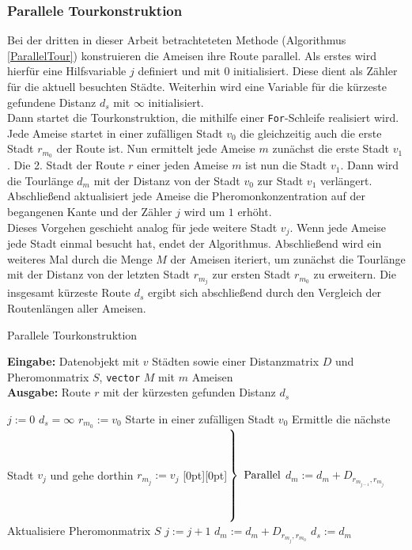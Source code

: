 \documentclass[doktyp=barbeit, sprache=german]{TUBAFarbeiten}
\begin{document}
\subsubsection{Parallele Tourkonstruktion}
Bei der dritten in dieser Arbeit betrachteteten Methode (Algorithmus \ref{ParallelTour}) konstruieren die Ameisen ihre Route parallel.
Als erstes wird hierfür eine Hilfsvariable $j$ definiert und mit $0$ initialisiert. Diese dient als Zähler für die aktuell besuchten Städte. Weiterhin wird eine Variable für die kürzeste gefundene Distanz $d_s$ mit $\infty$ initialisiert. \\Dann startet die Tourkonstruktion, die mithilfe einer \texttt{For}-Schleife realisiert wird. Jede Ameise startet in einer zufälligen Stadt $v_0$ die gleichzeitig auch die erste Stadt $r_{m_0}$ der Route ist. Nun ermittelt jede Ameise $m$ zunächst die erste Stadt $v_1$. Die 2. Stadt der Route $r$ einer jeden Ameise $m$ ist nun die Stadt $v_1$. Dann wird die Tourlänge $d_m$ mit der Distanz von der Stadt $v_0$ zur Stadt $v_1$ verlängert. Abschließend aktualisiert jede Ameise die Pheromonkonzentration auf der begangenen Kante und der Zähler $j$ wird um $1$ erhöht.
\\Dieses Vorgehen geschieht analog für jede weitere Stadt $v_j$. Wenn jede Ameise jede Stadt einmal besucht hat, endet der Algorithmus. Abschließend wird ein weiteres Mal durch die Menge $M$ der Ameisen iteriert, um zunächst die Tourlänge mit der Distanz von der letzten Stadt $r_{m_j}$ zur ersten Stadt $r_{m_0}$ zu erweitern. Die insgesamt kürzeste Route $d_s$ ergibt sich abschließend durch den Vergleich der Routenlängen aller Ameisen.
\begin{algorithm}
\caption{Parallele Tourkonstruktion}
\label{ParallelTour}
\textbf{Eingabe:} Datenobjekt mit $v$ Städten sowie einer Distanzmatrix $D$ und Pheromonmatrix $S$, \texttt{vector} $M$ mit $m$ Ameisen
\\\textbf{Ausgabe:} Route $r$ mit der kürzesten gefunden Distanz $d_s$
\begin{algorithmic}[1]
\State $j := 0$
\State $d_s = \infty$
\State $r_{m_0} := v_0$
\EndIf
\State Starte in einer zufälligen Stadt $v_0$
\State Ermittle die nächste Stadt $v_j$ und gehe dorthin
\State $r_{m_j} := v_j$
\hspace{17em}\raisebox{1.3\baselineskip}[0pt][0pt]{$\left.\rule{0pt}{3.8\baselineskip}\right\}\ \mbox{Parallel}$}
\State $d_m := d_m + D_{r_{m_{j-1}},r_{m_j}}$
\State Aktualisiere Pheromonmatrix $S$
\EndFor
\State $j := j + 1$
\EndWhile
{} 
\State $d_m := d_m + D_{r_{m_j},r_{m_0}}$
\State $d_s := d_m$
\EndIf
\EndFor
\end{algorithmic}
\end{algorithm}
\end{document}
